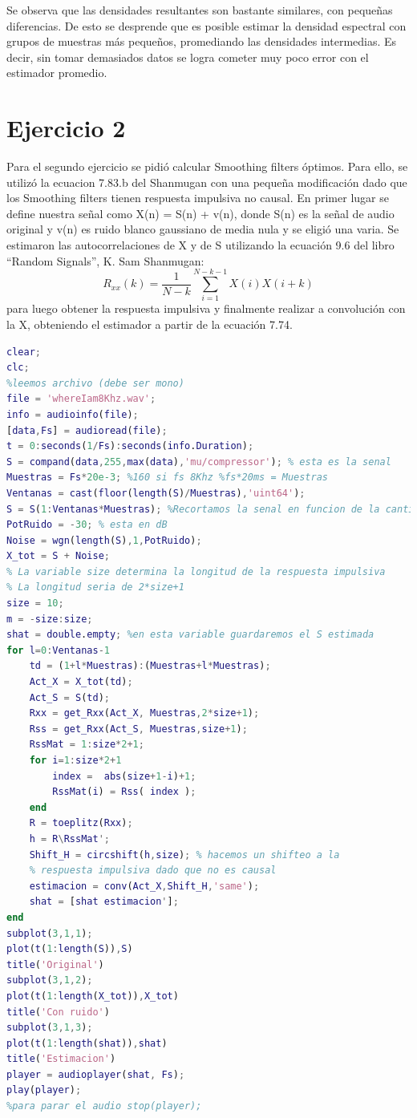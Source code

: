 Se observa que las densidades resultantes son bastante similares, con pequeñas diferencias. De esto se desprende que es posible estimar la densidad espectral con grupos de muestras más pequeños, promediando las densidades intermedias. Es decir, sin tomar demasiados datos se logra cometer muy poco error con el estimador promedio.

\newpage
\section*{Ejercicio 2}
Para el segundo ejercicio se pidió calcular Smoothing filters óptimos.
Para ello, se utilizó la ecuacion 7.83.b del Shanmugan con una pequeña modificación dado que los Smoothing filters tienen respuesta impulsiva no causal.
En primer lugar se define nuestra señal como X(n) = S(n) + v(n), donde S(n) es la señal de audio original y v(n) es ruido blanco gaussiano de media nula y se eligió una varia. Se estimaron las autocorrelaciones de X y de S utilizando la ecuación 9.6 del libro ``Random Signals'', K. Sam Shanmugan:
$$R_{xx}(k) = \frac{1}{N - k} \sum_{i=1}^{N-k-1}X(i)X(i+k)$$
 para luego obtener la respuesta impulsiva y finalmente realizar a convolución con la X, obteniendo el estimador a partir de la ecuación 7.74.

\begin{lstlisting}[language=Matlab, caption=Ejercicio2.m]
clear;
clc;
%leemos archivo (debe ser mono)
file = 'whereIam8Khz.wav';
info = audioinfo(file);
[data,Fs] = audioread(file);
t = 0:seconds(1/Fs):seconds(info.Duration);
S = compand(data,255,max(data),'mu/compressor'); % esta es la senal
Muestras = Fs*20e-3; %160 si fs 8Khz %fs*20ms = Muestras
Ventanas = cast(floor(length(S)/Muestras),'uint64'); 
S = S(1:Ventanas*Muestras); %Recortamos la senal en funcion de la cantidad de ventanas
PotRuido = -30; % esta en dB
Noise = wgn(length(S),1,PotRuido);
X_tot = S + Noise;
% La variable size determina la longitud de la respuesta impulsiva
% La longitud seria de 2*size+1
size = 10;
m = -size:size;
shat = double.empty; %en esta variable guardaremos el S estimada
for l=0:Ventanas-1
    td = (1+l*Muestras):(Muestras+l*Muestras);
    Act_X = X_tot(td);    
    Act_S = S(td);
    Rxx = get_Rxx(Act_X, Muestras,2*size+1);
    Rss = get_Rxx(Act_S, Muestras,size+1);
    RssMat = 1:size*2+1;
    for i=1:size*2+1
        index =  abs(size+1-i)+1;
        RssMat(i) = Rss( index );
    end
    R = toeplitz(Rxx);
    h = R\RssMat';
    Shift_H = circshift(h,size); % hacemos un shifteo a la 
    % respuesta impulsiva dado que no es causal
    estimacion = conv(Act_X,Shift_H,'same');        
    shat = [shat estimacion'];
end
subplot(3,1,1);
plot(t(1:length(S)),S)
title('Original')
subplot(3,1,2);
plot(t(1:length(X_tot)),X_tot)
title('Con ruido')
subplot(3,1,3);
plot(t(1:length(shat)),shat)
title('Estimacion')
player = audioplayer(shat, Fs);
play(player);
%para parar el audio stop(player);
\end{lstlisting}

